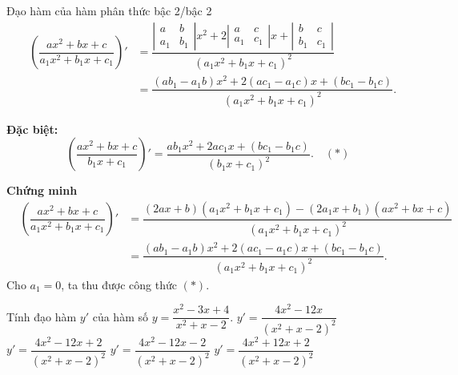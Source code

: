 \begin{dang}{Đạo hàm của hàm phân thức bậc 2/bậc 2}
	\begin{eqnarray*}
		&\left(\dfrac{ax^2+bx+c}{a_1x^2+b_1x+c_1} \right)'
		&=\dfrac{\left| \begin{matrix}
				a & b \\ a_1 & b_1
			\end{matrix} \right| x^2 + 2\left| \begin{matrix}
				a & c \\ a_1 & c_1
			\end{matrix} \right| x+ \left| \begin{matrix}
				b & c \\ b_1 & c_1
			\end{matrix} \right|}{(a_1x^2+b_1x+c_1)^2}\\
		&&=\dfrac{(ab_1-a_1b)x^2+2(ac_1-a_1c)x+(bc_1-b_1c)}{(a_1x^2+b_1x+c_1)^2}.
	\end{eqnarray*}
	
	\textbf{Đặc biệt:} 
	$$\left(\dfrac{ax^2+bx+c}{b_1x+c_1} \right)'=\dfrac{ab_1x^2+2ac_1x+(bc_1-b_1c)}{(b_1x+c_1)^2}.\quad (*)$$
\end{dang}
\textbf{Chứng minh}
\begin{eqnarray*}
	&\left(\dfrac{ax^2+bx+c}{a_1x^2+b_1x+c_1} \right)'
	&=\dfrac{(2ax+b)(a_1x^2+b_1x+c_1)-(2a_1x+b_1)(ax^2+bx+c)}{(a_1x^2+b_1x+c_1)^2}\\
	&&=\dfrac{(ab_1-a_1b)x^2+2(ac_1-a_1c)x+(bc_1-b_1c)}{(a_1x^2+b_1x+c_1)^2}.
\end{eqnarray*}
Cho $a_1=0$, ta thu được công thức $(*)$.
\begin{vd}%
	Tính đạo hàm $y'$ của hàm số $ y=\dfrac{x^2-3x+4}{x^2+x-2}$.
	\choice
	{$ y'=\dfrac{4x^2-12x}{\left(x^2+x-2\right)^{2}} $}
	{\True $ y'=\dfrac{4x^2-12x+2}{\left(x^2+x-2\right)^{2}} $}
	{$ y'=\dfrac{4x^2-12x-2}{\left(x^2+x-2\right)^{2}} $}
	{$ y'=\dfrac{4x^2+12x+2}{\left(x^2+x-2\right)^{2}} $}
\end{vd}
